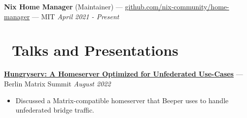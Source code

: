 \documentclass[10pt,letterpaper]{article}
\begin{document}
{\fontsize{11}{0}
\textbf{Nix Home Manager} (Maintainer) ---
\href{https://github.com/nix-community/home-manager}{github.com/nix-community/home-manager} --- MIT}
\hfill \textit{April 2021 - Present}


\section*{\faUsers\ Talks and Presentations}


{\fontsize{11}{0}\href{https://github.com/sumnerevans/hungryserv-presentation}{%
\textbf{Hungryserv: A Homeserver Optimized for Unfederated Use-Cases}}
--- Berlin Matrix Summit}
\hfill \textit{August 2022}
\begin{itemize}
    \item Discussed a Matrix-compatible homeserver that Beeper uses to handle
        unfederated bridge traffic.
\end{itemize}
\end{document}
